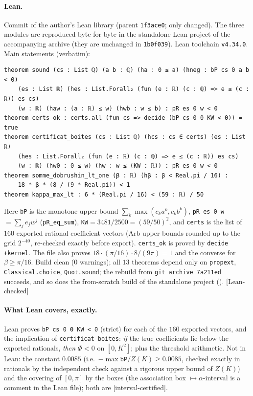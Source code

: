 \documentclass[11pt,a4paper]{article}
\theoremstyle{remark}
\theoremstyle{definition}
\theoremstyle{plain}
\theoremstyle{remark}
\newcommand{\st}[1]{\textsf{[#1]}}
\begin{document}
\paragraph{Lean.} Commit  of the author's Lean library (parent
\texttt{1f3ace0}; only  changed). The three modules are reproduced byte
for byte in the standalone Lean project  of the accompanying archive (they are unchanged in
\texttt{1b0f039}). Lean toolchain \texttt{v4.34.0}. Main statements (verbatim):
{\footnotesize
\begin{verbatim}
theorem sound (cs : List ℚ) (a b : ℚ) (ha : 0 ≤ a) (hneg : bP cs 0 a b < 0)
    (es : List ℝ) (hes : List.Forall₂ (fun (e : ℝ) (c : ℚ) => e ≤ (c : ℝ)) es cs)
    (w : ℝ) (haw : (a : ℝ) ≤ w) (hwb : w ≤ b) : pR es 0 w < 0
theorem certs_ok : certs.all (fun cs => decide (bP cs 0 0 KW < 0)) = true
theorem certificat_boites (cs : List ℚ) (hcs : cs ∈ certs) (es : List ℝ)
    (hes : List.Forall₂ (fun (e : ℝ) (c : ℚ) => e ≤ (c : ℝ)) es cs)
    (w : ℝ) (hw0 : 0 ≤ w) (hw : w ≤ (KW : ℝ)) : pR es 0 w < 0
theorem somme_dobrushin_lt_one (β : ℝ) (hβ : β < Real.pi / 16) :
    18 * β * (8 / (9 * Real.pi)) < 1
theorem kappa_max_lt : 6 * (Real.pi / 16) < (59 : ℝ) / 50
\end{verbatim}}
Here \texttt{bP} is the monotone upper bound $\sum_k\max(c_ka^k,c_kb^k)$, \texttt{pR es 0 w}${}=\sum_je_jw^j$
(\texttt{pR\_eq\_sum}), \texttt{KW}${}=3481/2500=(59/50)^2$, and \texttt{certs} is the list of $160$ exported
rational coefficient vectors (Arb upper bounds rounded up to the grid $2^{-40}$, re-checked exactly
before export). \texttt{certs\_ok} is proved by \texttt{decide +kernel}. The file also proves
$18\cdot(\pi/16)\cdot 8/(9\pi)=1$ and the converse for $\beta\ge\pi/16$.
Build clean (0 warnings); all $13$ theorems depend only on \texttt{propext}, \texttt{Classical.choice},
\texttt{Quot.sound}; the rebuild from \texttt{git archive 7a211ed} succeeds, and so does the from-scratch build of
the standalone project (). \st{Lean-checked}

\paragraph{What Lean covers, exactly.} Lean proves \texttt{bP cs 0 0 KW < 0} (strict) for each of the
$160$ exported vectors, and the implication of \texttt{certificat\_boites}: \emph{if} the true
coefficients lie below the exported rationals, \emph{then} $\Phi<0$ on $[0,K^2]$; plus the threshold
arithmetic. Not in Lean: the constant $0.0085$ (i.e.\ $-\max\texttt{bP}/Z(K)\ge0.0085$, checked exactly in
rationals by the independent check against a rigorous upper bound of $Z(K)$) and the covering of $[0,\pi]$ by the boxes
(the association box $\mapsto\alpha$-interval is a comment in the Lean file); both are
\st{interval-certified}.
\end{document}
